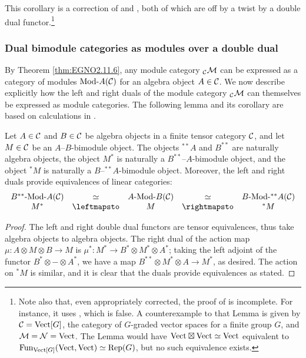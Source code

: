 \documentclass{amsart}
\begin{document}
\begin{remark} \label{rmk:Deligne_pdt_as_mod_functor}
This corollary is a correction of \cite[Remark 3.6]{0909.3140} and \cite[Thm. 3.20]{0911.4979}, both of which are off by a twist by a double dual functor.\footnote{Note also that, even appropriately corrected, the proof of \cite[Thm 3.20]{0911.4979} is incomplete.  For instance, it uses \cite[Lemma 3.21]{0911.4979}, which is false.  A counterexample to that Lemma is given by $\mathcal C = \mathrm{Vect}[G]$, the category of $G$-graded vector spaces for a finite group $G$, and $\mathcal M = \mathcal N = \mathrm{Vect}$.  The Lemma would have $\mathrm{Vect} \boxtimes \mathrm{Vect} \simeq \mathrm{Vect}$ equivalent to $\operatorname{Fun}_{\mathrm{Vect}[G]}(\mathrm{Vect},\mathrm{Vect}) \simeq \mathrm{Rep}(G)$, but no such equivalence exists.} 
\end{remark} %


\subsubsection{Dual bimodule categories as modules over a double dual}

By Theorem \ref{thm:EGNO2.11.6}, any module category ${}_\mathcal C \mathcal M$ can be expressed as a category of modules $\Mod{}{A}(\cC)$ for an algebra object $A \in \mathcal C$.  We now describe explicitly how the left and right duals of the module category ${}_\mathcal C \mathcal M$ can themselves be expressed as module categories.  The following lemma and its corollary are based on calculations in \cite[\S 3]{MR2097289}.

\begin{lemma}\label{lem:dualing-amod}
Let $A \in \mathcal C$ and $B \in \mathcal C$ be algebra objects in a finite tensor category $\mathcal C$, and let $M \in \mathcal C$ be an $A$--$B$-bimodule object.  The objects ${}^{**} A$ and $B^{**}$ are naturally algebra objects, the object $M^*$ is naturally a $B^{**}$--$A$-bimodule object, and the object ${}^* M$ is naturally a $B$--${}^{**} A$-bimodule object.  Moreover, the left and right duals provide equivalences of linear categories:
\begin{equation*}
\begin{array}{ccccc}
	\Mod{B^{**}}{A}(\cC) &\simeq& \Mod{A}{B}(\cC) &\simeq& \Mod{B}{{}^{**}A}(\cC) \\
	M^* &\leftmapsto& M &\rightmapsto& {}^* M
\end{array}
\end{equation*}
\end{lemma}

\begin{proof}
The left and right double dual functors are tensor equivalences, thus take algebra objects to algebra objects.  The right dual of the action map $\mu: A \otimes M \otimes B \rightarrow M$ is $\mu^*: M^* \rightarrow B^* \otimes M^* \otimes A^*$; taking the left adjoint of the functor $B^* \otimes - \otimes A^*$, we have a map $B^{**} \otimes M^* \otimes A \rightarrow M^*$, as desired.  The action on ${}^* M$ is similar, and it is clear that the duals provide equivalences as stated.
\end{proof}
\end{document}
